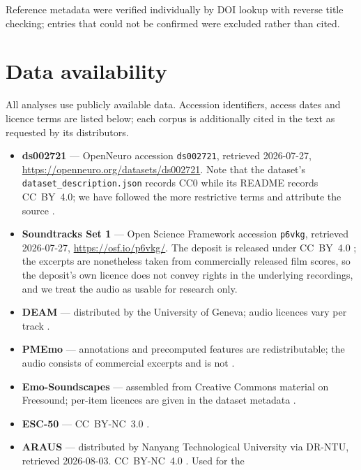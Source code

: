 Reference metadata were verified individually by DOI lookup with reverse title
checking; entries that could not be confirmed were excluded rather than cited.

\section*{Data availability}

All analyses use publicly available data. Accession identifiers, access dates and
licence terms are listed below; each corpus is additionally cited in the text as
requested by its distributors.

\begin{itemize}
\item \textbf{ds002721} --- OpenNeuro accession \texttt{ds002721}, retrieved
2026-07-27, \url{https://openneuro.org/datasets/ds002721}. Note that the dataset's
\texttt{dataset\_description.json} records CC0 while its README records
CC~BY~4.0; we have followed the more restrictive terms and attribute the source
\citep{daly2018data}.
\item \textbf{Soundtracks Set 1} --- Open Science Framework accession
\texttt{p6vkg}, retrieved 2026-07-27, \url{https://osf.io/p6vkg/}. The deposit is
released under CC~BY~4.0 \citep{eerola2011}; the excerpts are nonetheless taken
from commercially released film scores, so the deposit's own licence does not
convey rights in the underlying recordings, and we treat the audio as usable for
research only.
\item \textbf{DEAM} --- distributed by the University of Geneva; audio licences
vary per track \citep{aljanaki2017}.
\item \textbf{PMEmo} --- annotations and precomputed features are redistributable;
the audio consists of commercial excerpts and is not \citep{zhang2018pmemo}.
\item \textbf{Emo-Soundscapes} --- assembled from Creative Commons material on
Freesound; per-item licences are given in the dataset metadata
\citep{fan2017emo}.
\item \textbf{ESC-50} --- CC~BY-NC~3.0 \citep{piczak2015}.
\item \textbf{ARAUS} --- distributed by Nanyang Technological University via
DR-NTU, retrieved 2026-08-03. CC~BY-NC~4.0 \citep{ooi2024araus}. Used for the

\end{itemize}
